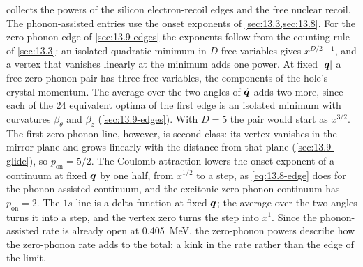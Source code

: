  collects the powers of the silicon electron-recoil edges and the free nuclear recoil. The phonon-assisted entries use the onset exponents of \cref{sec:13.3,sec:13.8}. For the zero-phonon edge of \cref{sec:13.9-edges} the exponents follow from the counting rule of \cref{sec:13.3}: an isolated quadratic minimum in $D$ free variables gives $x^{D/2 - 1}$, and a vertex that vanishes linearly at the minimum adds one power. At fixed $|\bm{q}|$ a free zero-phonon pair has three free variables, the components of the hole's crystal momentum. The average over the two angles of $\hat{\bm{q}}$ adds two more, since each of the 24 equivalent optima of the first edge is an isolated minimum with curvatures $\beta_\theta$ and $\beta_z$ (\cref{sec:13.9-edges}). With $D = 5$ the pair would start as $x^{3/2}$. The first zero-phonon line, however, is second class: its vertex vanishes in the mirror plane and grows linearly with the distance from that plane (\cref{sec:13.9-glide}), so $p_{\mathrm{on}} = 5/2$. The Coulomb attraction lowers the onset exponent of a continuum at fixed $\bm{q}$ by one half, from $x^{1/2}$ to a step, as \cref{eq:13.8-edge} does for the phonon-assisted continuum, and the excitonic zero-phonon continuum has $p_{\mathrm{on}} = 2$. The $1s$ line is a delta function at fixed $\bm{q}$; the average over the two angles turns it into a step, and the vertex zero turns the step into $x^1$. Since the phonon-assisted rate is already open at \SI{0.405}{MeV}, the zero-phonon powers describe how the zero-phonon rate adds to the total: a kink in the rate rather than the edge of the limit.


